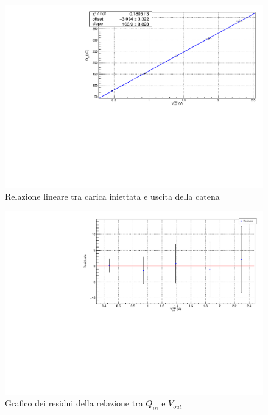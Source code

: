 \documentclass{article}
\begin{document}
\begin{center}
\begin{figure}[H]
\centering
\includegraphics[scale=0.4, angle=0]{fitcatena.pdf}
\caption{Relazione lineare tra carica iniettata e uscita della catena}
\label{fig:catenaQvsV}
\end{figure}
\end{center}

\begin{center}
\begin{figure}[H]
\centering
\includegraphics[scale=0.4, angle=0]{residuicatena.pdf}
\caption{Grafico dei residui della relazione tra $Q_{in}$ e $V_{out}$}
\label{fig:catenaQvsV_res}
\end{figure}
\end{center}
\end{document}
